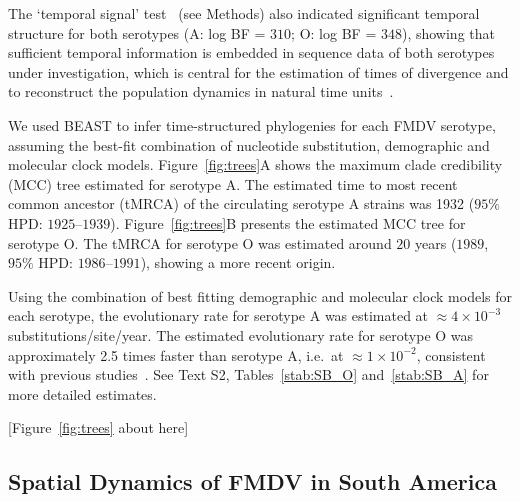 \documentclass[10pt]{article}
\begin{document}
The `temporal signal' test~\cite{Faria2012} (see Methods) also indicated significant temporal structure for both serotypes (A: log BF = $310$; O: log BF = $348$), showing that sufficient temporal information is embedded in sequence data of both serotypes under investigation, which is central for the estimation of times of divergence and to reconstruct the population dynamics in natural time units~\cite{MEP}.

We used BEAST to infer time-structured phylogenies for each FMDV serotype, assuming the best-fit combination of nucleotide substitution, demographic and molecular clock models.
Figure~\ref{fig:trees}A shows the maximum clade credibility (MCC) tree estimated for serotype A.
The estimated time to most recent common ancestor (tMRCA) of the circulating serotype A strains was 1932 ($95\%$ HPD: $1925$--$1939$).
Figure~\ref{fig:trees}B presents the estimated MCC tree for serotype O.
The tMRCA for serotype O was estimated around $20$ years ($1989$, $95\%$ HPD: $ 1986$--$1991$), showing a more recent origin. 

Using the combination of best fitting demographic and molecular clock models for each serotype, the evolutionary rate for serotype A was estimated at $\approx 4 \times 10^{-3}$ substitutions/site/year.
The estimated evolutionary rate for serotype O was approximately 2.5 times faster than serotype A, i.e.~at $\approx 1 \times 10^{-2}$, consistent with previous studies~\cite{tully, Carvalho2013, Muellner2011}.
See Text S2, Tables~\ref{stab:SB_O} and~\ref{stab:SB_A} for more detailed estimates.

\begin{center}
 [Figure~\ref{fig:trees} about here]
\end{center}

\subsection*{Spatial Dynamics of FMDV in South America}
\end{document}
